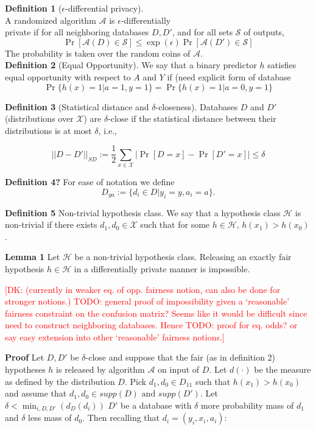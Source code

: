 \documentclass[format = sigconf]{acmart}
\newcommand{\dk}[1]{\textcolor{red}{[DK: #1]}}
\newcommand{\A}{\mathcal{A}}
\renewcommand{\H}{\mathcal{H}}
\newcommand{\1}{\mathbbm{1}}
\renewcommand{\S}{\mathcal{S}}
\theoremstyle{definition}
\begin{document}
{\bf Definition 1} ($\epsilon$-differential privacy). \\
A randomized algorithm $\A$ is $\epsilon$-differentially \\private if for all neighboring databases $D, D'$, and for all sets $\S$ of outputs,
$$\Pr[\A(D)\in \S] \leq \exp(\epsilon)\Pr[\A(D')\in \S]$$
The probability is taken over the random coins of $\A$.\\
{\bf Definition 2} (Equal Opportunity). We say that a binary predictor $h$ satisfies equal opportunity with respect to $A$ and $Y$ if (need explicit form of database
$$\Pr\{h(x) = 1 | a = 1, y = 1\} = \Pr\{h(x) = 1 | a=0, y=1\}$$


{\bf Definition 3} (Statistical distance and $\delta$-closeness). Databases  $D$ and $D'$ (distributions over $\mathcal{X}$) are $\delta$-close if the statistical distance between their distributions is at most $\delta$, i.e.,

$$ ||D-D'||_{\textit{SD}} :=\frac{1}{2}\sum_{x\in \mathcal{X}} |\Pr[D=x] - \Pr[D'=x]| \leq \delta$$

{\bf Definition 4?} For ease of notation we define
$$D_{ya} := \{d_i \in D | y_i = y, a_i = a \}.$$

{\bf Definition 5} Non-trivial hypothesis class. We say that a hypothesis class $\H$ is non-trivial if there exists $d_1, d_0 \in \mathcal{X}$ such that for some $h \in \H$, $h(x_1) > h(x_0)$.

{\bf Lemma 1} Let $\mathcal{H}$ be a non-trivial hypothesis class. Releasing an exactly fair hypothesis $h\in \mathcal{H}$ in a differentially private manner is impossible.

\dk{ (currently in weaker eq. of opp. fairness notion, can also be done for stronger notions.) TODO: general proof of impossibility given a `reasonable' fairness constraint on the confusion matrix? Seems like it would be difficult since need to construct neighboring databases. Hence TODO: proof for eq. odds? or say easy extension into other `reasonable' fairness notions.}

{\bf Proof} Let $D, D'$ be $\delta$-close and suppose that the fair (as in definition 2) hypotheses $h$ is released by algorithm $\mathcal{A}$ on input of $D$. Let $d(\cdot)$ be the measure as defined by the distribution $D$. Pick $d_1, d_0 \in D_{11}$ such that $h(x_1) > h(x_0)$ and assume that $d_1, d_0 \in supp(D) \text{ and } supp(D')$. Let $\delta < \min_{i,D,D'}(d_{D}(d_i))$ $D'$ be a database with $\delta$ more probability mass of $d_1$ and $\delta$ less mass of $d_0$. Then recalling that $d_i = (y_i, x_i, a_i)$:
\end{document}
